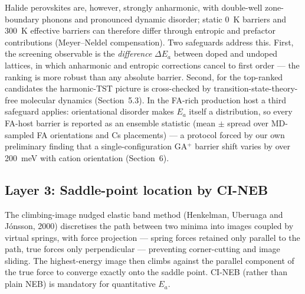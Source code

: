 \documentclass[11pt,a4paper]{article}
\begin{document}
Halide perovskites are, however, strongly anharmonic, with double-well zone-boundary
phonons and pronounced dynamic disorder; static 0~K barriers and 300~K effective
barriers can therefore differ through entropic and prefactor contributions
(Meyer--Neldel compensation). Two safeguards address this. First, the screening
observable is the \emph{difference} $\Delta E_a$ between doped and undoped lattices, in
which anharmonic and entropic corrections cancel to first order --- the ranking is
more robust than any absolute barrier. Second, for the top-ranked candidates the
harmonic-TST picture is cross-checked by transition-state-theory-free molecular
dynamics (Section~5.3). In the FA-rich production host a third safeguard applies:
orientational disorder makes $E_a$ itself a distribution, so every FA-host barrier is
reported as an ensemble statistic (mean $\pm$ spread over MD-sampled FA orientations
and Cs placements) --- a protocol forced by our own preliminary finding that a
single-configuration GA$^+$ barrier shift varies by over 200~meV with cation
orientation (Section~6).

\subsection{Layer 3: Saddle-point location by CI-NEB}
The climbing-image nudged elastic band method (Henkelman, Uberuaga and J\'onsson, 2000)
discretises the path between two minima into images coupled by virtual springs, with
force projection --- spring forces retained only parallel to the path, true forces only
perpendicular --- preventing corner-cutting and image sliding. The highest-energy image
then climbs against the parallel component of the true force to converge exactly onto
the saddle point. CI-NEB (rather than plain NEB) is mandatory for quantitative $E_a$.
\end{document}
